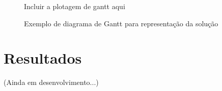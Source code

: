     \begin{figure}[h]
        \centering
        \small{Incluir a plotagem de gantt aqui}
        \caption{Exemplo de diagrama de Gantt para representação da solução}
        \label{fig:exemplo-gantt}
    \end{figure}
    




\section{Resultados}
    (Ainda em desenvolvimento...)






